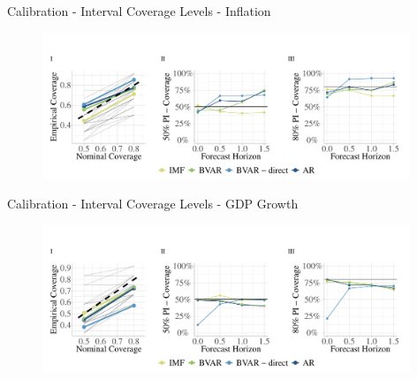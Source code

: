 \documentclass[en]{sdqbeamer}
\begin{document}

\begin{frame}{Calibration - Interval Coverage Levels - Inflation}
    \begin{figure}
        \centering
        \includegraphics[width=0.98\textwidth]{figures_svr/svr_coverage_pcpi_pch_absolute_rollingwindow.pdf}
        \label{fig:enter-label}
    \end{figure}
\end{frame}

\begin{frame}{Calibration - Interval Coverage Levels - GDP Growth}
    \begin{figure}
        \centering
        \includegraphics[width=0.98\textwidth]{figures_svr/svr_coverage_ngdp_rpch_absolute_rollingwindow.pdf}
        \label{fig:enter-label}
    \end{figure}
\end{frame}
\end{document}
